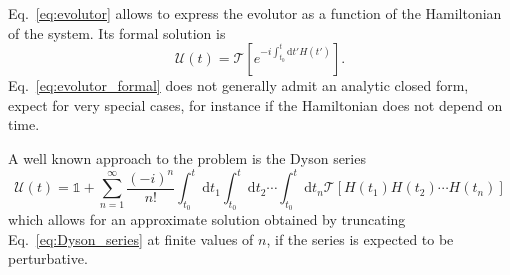 \documentclass{article}
\newcommand{\de}[0]{\text{d}}
\begin{document}
Eq.~\ref{eq:evolutor} allows to express the evolutor as a function of the Hamiltonian of the system. Its formal solution is
\begin{equation}
	\mathcal{U}(t) = \mathcal{T} \left[ e^{-i \int_{t_0}^t \de t' H(t')} \right].\label{eq:evolutor_formal}
\end{equation}
Eq.~\ref{eq:evolutor_formal} does not generally admit an analytic closed form, expect for very special cases, for instance if the Hamiltonian does not depend on time.

A well known approach to the problem is the Dyson series 
\begin{equation}
	\mathcal{U}(t) = \mathbb{1} + \sum_{n=1}^\infty \frac{\left(-i\right)^n}{n!} \int_{t_0}^t \de t_1 \int_{t_0}^t \de t_2 \cdots \int_{t_0}^t \de t_n \mathcal{T} \left[H(t_1) H(t_2) \cdots H(t_n) \right] \label{eq:Dyson_series}
\end{equation}
which allows for an approximate solution obtained by truncating Eq.~\ref{eq:Dyson_series} at finite values of $n$, if the series is expected to be perturbative. 
%
%
\end{document}
